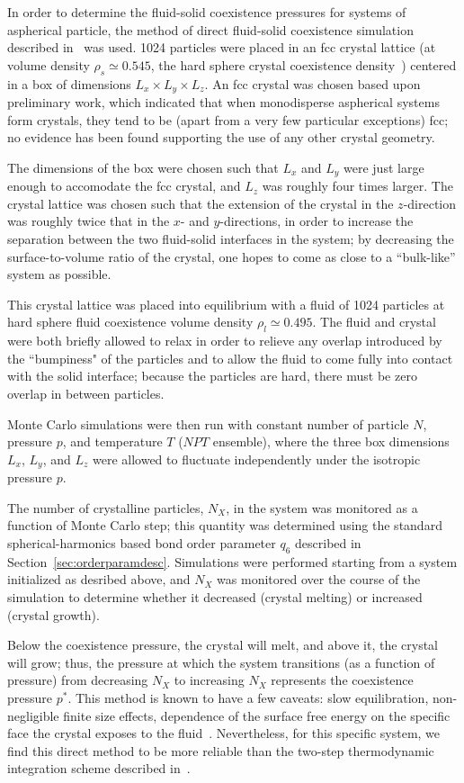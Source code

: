 In order to determine the fluid-solid coexistence pressures for systems of aspherical particle, the method of direct fluid-solid coexistence simulation described in~\cite{noya} was used.
1024 particles were placed in an fcc crystal lattice (at volume density $\rho_s \simeq 0.545$, the hard sphere crystal coexistence density~\cite{HScoex}) centered in a box of dimensions $L_x \times L_y \times L_z$.
An fcc crystal was chosen based upon preliminary work, which indicated that when monodisperse aspherical systems form crystals, they tend to be (apart from a very few particular exceptions) fcc; no evidence has been found supporting the use of any other crystal geometry.

The dimensions of the box were chosen such that $L_x$ and $L_y$ were just large enough to accomodate the fcc crystal, and $L_z$ was roughly four times larger.
The crystal lattice was chosen such that the extension of the crystal in the $z$-direction was roughly twice that in the $x$- and $y$-directions, in order to increase the separation between the two fluid-solid interfaces in the system; by decreasing the surface-to-volume ratio of the crystal, one hopes to come as close to a ``bulk-like'' system as possible.

This crystal lattice was placed into equilibrium with a fluid of 1024 particles at hard sphere fluid coexistence volume density $\rho_l \simeq 0.495$.
The fluid and crystal were both briefly allowed to relax in order to relieve any overlap introduced by the ``bumpiness" of the particles and to allow the fluid to come fully into contact with the solid interface; because the particles are hard, there must be zero overlap in between particles.

Monte Carlo simulations were then run with constant number of particle $N$, pressure $p$, and temperature $T$ ($NPT$ ensemble), where the three box dimensions $L_x$, $L_y$, and $L_z$ were allowed to fluctuate independently under the isotropic pressure $p$.

The number of crystalline particles, $N_X$, in the system was monitored as a function of Monte Carlo step; this quantity was determined using the standard spherical-harmonics based bond order parameter $q_6$ described in Section~\ref{sec:orderparamdesc}.
Simulations were performed starting from a system initialized as desribed above, and $N_X$ was monitored over the course of the simulation to determine whether it decreased (crystal melting) or increased (crystal growth).

Below the coexistence pressure, the crystal will melt, and above it, the crystal will grow; thus, the pressure at which the system transitions (as a function of pressure) from decreasing $N_X$ to increasing $N_X$ represents the coexistence pressure $p^*$.
This method is known to have a few caveats: slow equilibration, non-negligible finite size effects,  dependence of the surface free energy on the specific face the crystal exposes to the fluid~\cite{noya}.
Nevertheless, for this specific system, we find this direct  method to be  more reliable than the two-step thermodynamic integration scheme described in~\cite{dijkstra}. 

